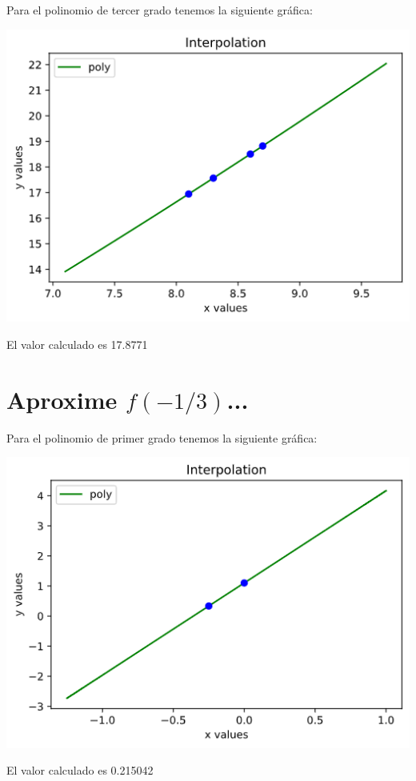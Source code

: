 \documentclass{article}
\begin{document}
Para el polinomio de tercer grado tenemos la siguiente gráfica:
\begin{center}
\includegraphics[scale=0.75]{grafica1-3.png}
\end{center}
El valor calculado es 17.8771
\section{Aproxime $f(-1/3)$...}
Para el polinomio de primer grado tenemos la siguiente gráfica:
\begin{center}
\includegraphics[scale=0.75]{grafica2-1.png}
\end{center}
El valor calculado es 0.215042\\
\end{document}
